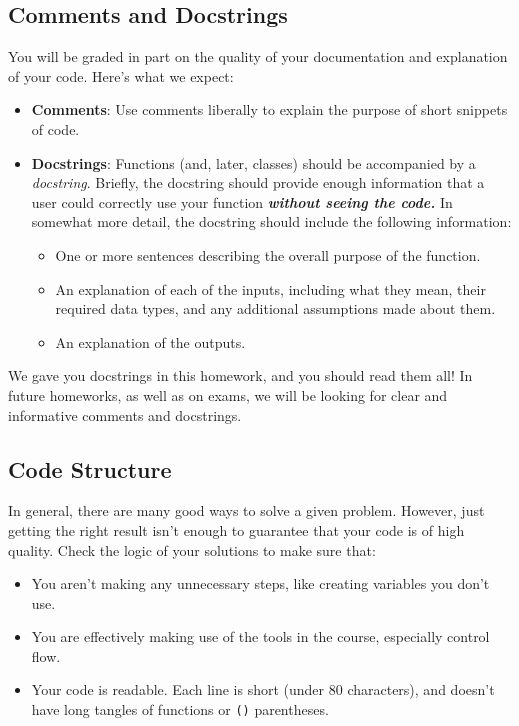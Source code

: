 \documentclass[11pt]{article}
\providecommand{\tightlist}{%
      \setlength{\itemsep}{0pt}\setlength{\parskip}{0pt}}
\begin{document}
    \subsection{Comments and Docstrings}\label{comments-and-docstrings}

You will be graded in part on the quality of your documentation and
explanation of your code. Here's what we expect:

\begin{itemize}
\tightlist
\item
  \textbf{Comments}: Use comments liberally to explain the purpose of
  short snippets of code.
\item
  \textbf{Docstrings}: Functions (and, later, classes) should be
  accompanied by a \emph{docstring}. Briefly, the docstring should
  provide enough information that a user could correctly use your
  function \textbf{\emph{without seeing the code.}} In somewhat more
  detail, the docstring should include the following information:

  \begin{itemize}
  \tightlist
  \item
    One or more sentences describing the overall purpose of the
    function.
  \item
    An explanation of each of the inputs, including what they mean,
    their required data types, and any additional assumptions made about
    them.
  \item
    An explanation of the outputs.
  \end{itemize}
\end{itemize}

We gave you docstrings in this homework, and you should read them all!
In future homeworks, as well as on exams, we will be looking for clear
and informative comments and docstrings.

\subsection{Code Structure}\label{code-structure}

In general, there are many good ways to solve a given problem. However,
just getting the right result isn't enough to guarantee that your code
is of high quality. Check the logic of your solutions to make sure that:

\begin{itemize}
\tightlist
\item
  You aren't making any unnecessary steps, like creating variables you
  don't use.
\item
  You are effectively making use of the tools in the course, especially
  control flow.
\item
  Your code is readable. Each line is short (under 80 characters), and
  doesn't have long tangles of functions or \texttt{()} parentheses.
\end{itemize}
\end{document}

